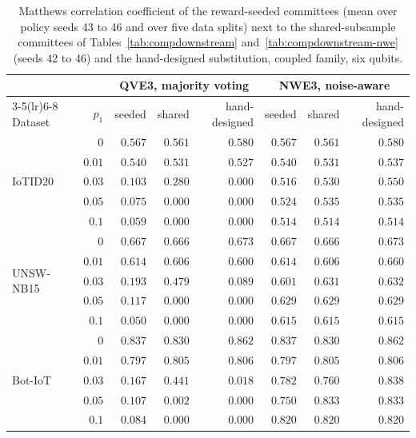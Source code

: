 \begin{table}[t]
\centering
\caption{Matthews correlation coefficient of the reward-seeded committees (mean over policy
seeds 43 to 46 and over five data splits) next to the shared-subsample committees
of Tables~\ref{tab:compdownstream} and~\ref{tab:compdownstream-nwe} (seeds 42 to 46)
and the hand-designed substitution, coupled family, six qubits.}
\label{tab:s3downstream}
\footnotesize
\setlength{\tabcolsep}{3pt}
\begin{tabular}{@{}lrrrrrrr@{}}
\toprule
& & \multicolumn{3}{c}{QVE3, majority voting} & \multicolumn{3}{c}{NWE3, noise-aware} \\
\cmidrule(lr){3-5}\cmidrule(lr){6-8}
Dataset & $p_1$ & seeded & shared & hand-designed & seeded & shared & hand-designed \\
\midrule
\multirow{5}{*}{IoTID20}
 & $0$ & $0.567$ & $0.561$ & $0.580$ & $0.567$ & $0.561$ & $0.580$ \\
 & $0.01$ & $0.540$ & $0.531$ & $0.527$ & $0.540$ & $0.531$ & $0.537$ \\
 & $0.03$ & $0.103$ & $0.280$ & $0.000$ & $0.516$ & $0.530$ & $0.550$ \\
 & $0.05$ & $0.075$ & $0.000$ & $0.000$ & $0.524$ & $0.535$ & $0.535$ \\
 & $0.1$ & $0.059$ & $0.000$ & $0.000$ & $0.514$ & $0.514$ & $0.514$ \\
\midrule
\multirow{5}{*}{UNSW-NB15}
 & $0$ & $0.667$ & $0.666$ & $0.673$ & $0.667$ & $0.666$ & $0.673$ \\
 & $0.01$ & $0.614$ & $0.606$ & $0.600$ & $0.614$ & $0.606$ & $0.660$ \\
 & $0.03$ & $0.193$ & $0.479$ & $0.089$ & $0.601$ & $0.631$ & $0.632$ \\
 & $0.05$ & $0.117$ & $0.000$ & $0.000$ & $0.629$ & $0.629$ & $0.629$ \\
 & $0.1$ & $0.050$ & $0.000$ & $0.000$ & $0.615$ & $0.615$ & $0.615$ \\
\midrule
\multirow{5}{*}{Bot-IoT}
 & $0$ & $0.837$ & $0.830$ & $0.862$ & $0.837$ & $0.830$ & $0.862$ \\
 & $0.01$ & $0.797$ & $0.805$ & $0.806$ & $0.797$ & $0.805$ & $0.806$ \\
 & $0.03$ & $0.167$ & $0.441$ & $0.018$ & $0.782$ & $0.760$ & $0.838$ \\
 & $0.05$ & $0.107$ & $0.002$ & $0.000$ & $0.750$ & $0.833$ & $0.833$ \\
 & $0.1$ & $0.084$ & $0.000$ & $0.000$ & $0.820$ & $0.820$ & $0.820$ \\
\bottomrule
\end{tabular}
\end{table}
